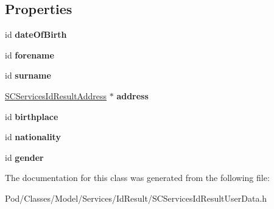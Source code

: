 \subsection*{Properties}
\begin{DoxyCompactItemize}
\item 
id {\bfseries date\+Of\+Birth}\hypertarget{interface_s_c_services_id_result_user_data_ab556738de5e64c24adbe36b34897b8c0}{}\label{interface_s_c_services_id_result_user_data_ab556738de5e64c24adbe36b34897b8c0}

\item 
id {\bfseries forename}\hypertarget{interface_s_c_services_id_result_user_data_a0b0013df484b20c375fa92e09079ef82}{}\label{interface_s_c_services_id_result_user_data_a0b0013df484b20c375fa92e09079ef82}

\item 
id {\bfseries surname}\hypertarget{interface_s_c_services_id_result_user_data_ab04b69db9fe99043d92d71fb787ae2a8}{}\label{interface_s_c_services_id_result_user_data_ab04b69db9fe99043d92d71fb787ae2a8}

\item 
\hyperlink{interface_s_c_services_id_result_address}{S\+C\+Services\+Id\+Result\+Address} $\ast$ {\bfseries address}\hypertarget{interface_s_c_services_id_result_user_data_ae386d5efd001f817c44e04149ade97c7}{}\label{interface_s_c_services_id_result_user_data_ae386d5efd001f817c44e04149ade97c7}

\item 
id {\bfseries birthplace}\hypertarget{interface_s_c_services_id_result_user_data_a1e158ea0098b261abebef11a8b59d96b}{}\label{interface_s_c_services_id_result_user_data_a1e158ea0098b261abebef11a8b59d96b}

\item 
id {\bfseries nationality}\hypertarget{interface_s_c_services_id_result_user_data_a562e9fff0918b0330f231cd5a5aa0fa0}{}\label{interface_s_c_services_id_result_user_data_a562e9fff0918b0330f231cd5a5aa0fa0}

\item 
id {\bfseries gender}\hypertarget{interface_s_c_services_id_result_user_data_afcbbc016d12c97023cb21675e0bfdb64}{}\label{interface_s_c_services_id_result_user_data_afcbbc016d12c97023cb21675e0bfdb64}

\end{DoxyCompactItemize}


The documentation for this class was generated from the following file\+:\begin{DoxyCompactItemize}
\item 
Pod/\+Classes/\+Model/\+Services/\+Id\+Result/S\+C\+Services\+Id\+Result\+User\+Data.\+h\end{DoxyCompactItemize}
